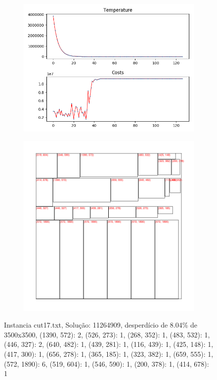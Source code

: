 \begin{figure}
\centering
\begin{subfigure}{.5\textwidth}
  \centering
  \includegraphics[width=1\linewidth]{results/cut17/3/plot}
  \label{fig:sub1}
\end{subfigure}%
\begin{subfigure}{.5\textwidth}
  \centering
  \includegraphics[width=1\linewidth]{results/cut17/3/cut}
  \label{fig:sub2}
\end{subfigure}
\caption{Instancia cut17.txt, Solução: 11264909, desperdício de 8.04\% de 3500x3500, {(1390, 572): 2, (526, 273): 1, (268, 352): 1, (483, 532): 1, (446, 327): 2, (640, 482): 1, (439, 281): 1, (116, 439): 1, (425, 148): 1, (417, 300): 1, (656, 278): 1, (365, 185): 1, (323, 382): 1, (659, 555): 1, (572, 1890): 6, (519, 604): 1, (546, 590): 1, (200, 378): 1, (414, 678): 1}}
\label{fig:test}
\end{figure}


